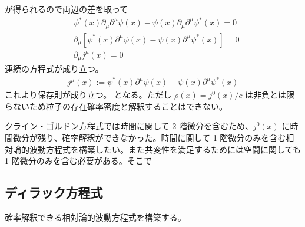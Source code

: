 \documentclass[uplatex,dvipdfmx,a4paper,11pt]{jlreq}
\numberwithin{equation}{section}
\theoremstyle{definition}
\begin{document}
が得られるので両辺の差を取って
\begin{align}
   & \psi^*(x)\partial_\mu\partial^\mu\psi(x) - \psi(x)\partial_\mu\partial^\mu\psi^*(x) = 0 \\
   & \partial_\mu[\psi^*(x)\partial^\mu\psi(x) - \psi(x)\partial^\mu\psi^*(x)] = 0           \\
   & \partial_\mu j^\mu(x) = 0
\end{align}
連続の方程式が成り立つ。
\begin{align}
  j^\mu(x) := \psi^*(x)\partial^\mu\psi(x) - \psi(x)\partial^\mu\psi^*(x)
\end{align}
これより保存則が成り立つ。
となる。ただし $\rho(x) = j^0(x)/c$ は非負とは限らないため粒子の存在確率密度と解釈することはできない。

クライン・ゴルドン方程式では時間に関して 2 階微分を含むため、$j^0(x)$ に時間微分が残り、確率解釈ができなかった。時間に関して 1 階微分のみを含む相対論的波動方程式を構築したい。また共変性を満足するためには空間に関しても 1 階微分のみを含む必要がある。そこで

\subsection{ディラック方程式}
確率解釈できる相対論的波動方程式を構築する。
\end{document}
